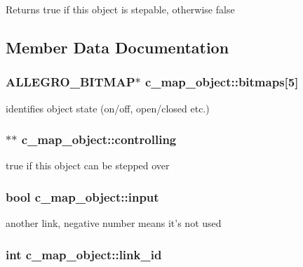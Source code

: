\begin{DoxyReturn}{Returns}
true if this object is stepable, otherwise false 
\end{DoxyReturn}


\subsection{Member Data Documentation}
\hypertarget{classc__map__object_af9e944bd38ae90bfa3f9f051ec9dd8fa}{
\subsubsection[{bitmaps}]{\setlength{\rightskip}{0pt plus 5cm}A\-L\-L\-E\-G\-R\-O\-\_\-\-B\-I\-T\-M\-A\-P$\ast$ c\-\_\-map\-\_\-object\-::bitmaps\mbox{[}5\mbox{]}\hspace{0.3cm}{\ttfamily [protected]}}}\label{classc__map__object_af9e944bd38ae90bfa3f9f051ec9dd8fa}
identifies object state (on/off, open/closed etc.) \hypertarget{classc__map__object_af772ed08fc85de963e5cd18b403eecca}{
\subsubsection[{controlling}]{$\ast$$\ast$ c\-\_\-map\-\_\-object\-::controlling\hspace{0.3cm}{\ttfamily [protected]}}}\label{classc__map__object_af772ed08fc85de963e5cd18b403eecca}
true if this object can be stepped over \hypertarget{classc__map__object_a67285c4371f63f7a3e31e81d89696271}{
\subsubsection[{input}]{\setlength{\rightskip}{0pt plus 5cm}bool c\-\_\-map\-\_\-object\-::input\hspace{0.3cm}{\ttfamily [protected]}}}\label{classc__map__object_a67285c4371f63f7a3e31e81d89696271}
another link, negative number means it's not used \hypertarget{classc__map__object_a4563fd9421b83b1349e4e74559b22507}{
\subsubsection[{link\-\_\-id}]{\setlength{\rightskip}{0pt plus 5cm}int c\-\_\-map\-\_\-object\-::link\-\_\-id\hspace{0.3cm}{\ttfamily [protected]}}}\label{classc__map__object_a4563fd9421b83b1349e4e74559b22507}
